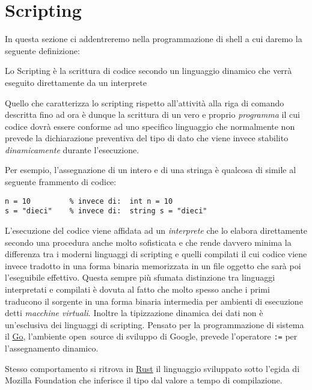 
\chapter{Scripting}
\label{chapScripting}

In questa sezione ci addentreremo nella programmazione di shell a cui daremo
la seguente definizione:

\begin{tcolorbox}[title=Definizione di \emph{Scripting}]
Lo Scripting è la scrittura di codice secondo un linguaggio dinamico che verrà
eseguito direttamente da un interprete
\end{tcolorbox}

Quello che caratterizza lo scripting rispetto all'attività alla riga di
comando descritta fino ad ora è dunque la scrittura di un vero e proprio
\emph{programma} il cui codice dovrà essere conforme ad uno specifico
linguaggio che normalmente non prevede la dichiarazione preventiva del tipo di
dato che viene invece stabilito \emph{dinamicamente} durante l'esecuzione.

Per esempio, l'assegnazione di un intero e di una stringa è qualcosa di simile
al seguente frammento di codice:
\begin{Verbatim}
n = 10         % invece di:  int n = 10
s = "dieci"    % invece di:  string s = "dieci"
\end{Verbatim}

L'esecuzione del codice viene affidata ad un \emph{interprete} che lo
elabora direttamente secondo una procedura anche molto sofisticata e che rende
davvero minima la differenza tra i moderni linguaggi di scripting e quelli
compilati il cui codice viene invece tradotto in una forma binaria
memorizzata in un file oggetto che sarà poi l'eseguibile effettivo.
Questa sempre più sfumata distinzione tra linguaggi interpretati e compilati è
dovuta al fatto che molto spesso anche i primi traducono il sorgente in
una forma binaria intermedia per ambienti di esecuzione detti \emph{macchine
virtuali}. Inoltre la tipizzazione dinamica dei dati non è un'esclusiva dei
linguaggi di scripting. Pensato per la programmazione di sistema il
\href{http://golang.org/}{Go}, l'ambiente open~source di sviluppo di Google,
prevede l'operatore \texttt{:=} per l'assegnamento dinamico.

Stesso comportamento si ritrova in \href{http://www.rust-lang.org/}{Rust} il
linguaggio sviluppato sotto l'egida di Mozilla Foundation che inferisce il
tipo dal valore a tempo di compilazione.

